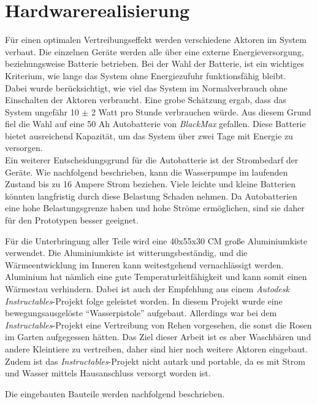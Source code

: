 

\section{Hardwarerealisierung}

Für einen optimalen Vertreibungseffekt werden verschiedene Aktoren im System verbaut. Die einzelnen Geräte werden alle über eine externe Energieversorgung, beziehungsweise Batterie betrieben. Bei der Wahl der Batterie, ist ein wichtiges Kriterium, wie lange das System ohne Energiezufuhr funktionsfähig bleibt.
\\
Dabei wurde berücksichtigt, wie viel das System im Normalverbrauch ohne Einschalten der Aktoren verbraucht. Eine grobe Schätzung ergab, dass das System ungefähr 10 $\pm$ 2 Watt pro Stunde verbrauchen würde. Aus diesem Grund fiel die Wahl auf eine 50 Ah Autobatterie von \textit{BlackMax} \cite{Autobatterie} gefallen. Diese Batterie bietet ausreichend Kapazität, um das System über zwei Tage mit Energie zu versorgen.
\\
Ein weiterer Entscheidungsgrund für die Autobatterie ist der Strombedarf der Geräte. Wie nachfolgend beschrieben, kann die Wasserpumpe im laufenden Zustand bis zu 16 Ampere Strom beziehen. Viele leichte und kleine Batterien könnten langfristig durch diese Belastung Schaden nehmen. Da Autobatterien eine hohe Belastungsgrenze haben und hohe Ströme ermöglichen, sind sie daher für den Prototypen besser geeignet.

Für die Unterbringung aller Teile wird eine 40x55x30 \ac{CM} große Aluminiumkiste verwendet. Die Aluminiumkiste ist witterungsbeständig, und die Wärmeentwicklung im Inneren kann weitestgehend vernachlässigt werden. Aluminium hat nämlich eine gute Temperaturleitfähigkeit und kann somit einen Wärmestau verhindern. Dabei ist auch der Empfehlung aus einem \textit{Autodesk Instructables}-Projekt folge geleistet worden. In diesem Projekt wurde eine bewegungsausgelöste \enquote{Wasserpistole} aufgebaut. Allerdings war bei dem \textit{Instructables}-Projekt eine Vertreibung von Rehen vorgesehen, die sonst die Rosen im Garten aufgegessen hätten. Das Ziel dieser Arbeit ist es aber Waschbären und andere Kleintiere zu vertreiben, daher sind hier noch weitere Aktoren eingebaut. Zudem ist das \textit{Instructables}-Projekt nicht autark und portable, da es mit Strom und Wasser mittels Hausanschluss versorgt worden ist. \cite{watergun_dude}

Die eingebauten Bauteile werden nachfolgend beschrieben.

